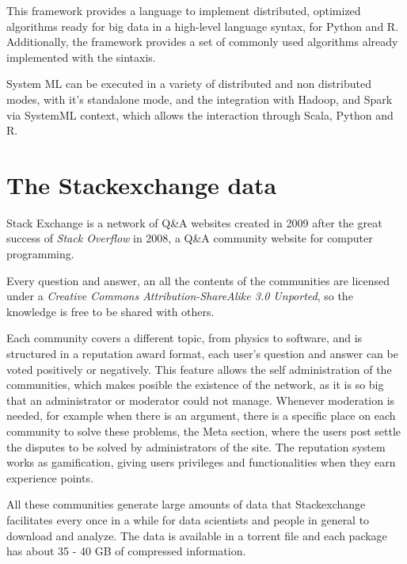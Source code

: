 \documentclass[11pt]{book} %
\begin{document}
    This framework provides a language to implement distributed, optimized algorithms ready for big data in a high-level language syntax, for Python and R. Additionally, the framework provides a set of commonly used algorithms already implemented with the sintaxis.

    System ML can be executed in a variety of distributed and non distributed modes, with it's standalone mode, and the integration with Hadoop, and Spark via SystemML context, which allows the interaction through Scala, Python and R.


  \section{The Stackexchange data}
  \label{subsec:data_structure}


    Stack Exchange is a network of Q\&A websites created in 2009 after the great success of \emph{Stack Overflow} in 2008, a Q\&A community website for computer programming.

    Every question and answer, an all the contents of the communities are licensed under a \emph{Creative Commons Attribution-ShareAlike 3.0 Unported}, so the knowledge is free to be shared with others.

    Each community covers a different topic, from physics to software, and is structured in a reputation award format, each user's question and answer can be voted positively or negatively. This feature allows the self administration of the communities, which makes posible the existence of the network, as it is so big that an administrator or moderator could not manage. Whenever moderation is needed, for example when there is an argument, there is a specific place on each community to solve these problems, the Meta section, where the users post settle the disputes to be solved by administrators of the site. The reputation system works as gamification, giving users privileges and functionalities when they earn experience points.

    All these communities generate large amounts of data that Stackexchange facilitates every once in a while for data scientists and people in general to download and analyze. The data is available in a torrent file and each package has about 35 - 40 GB of compressed information.
\end{document}
